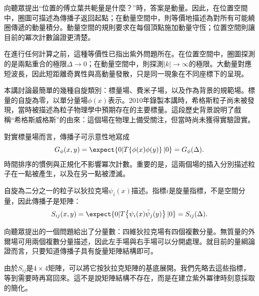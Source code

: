 向聽眾提出``位置的傅立葉共軛量是什麼？''時，答案是動量。因此，在位置空間中，圈圖可描述為傳播子返回起點；在動量空間中，則等價地描述為對所有可能繞圈傳遞的動量積分。動量空間的規則要求在每個頂點施加動量守恆；位置空間則讓目前的冪次計數論證更清楚。

在進行任何計算之前，這種等價性已指出紫外問題所在。在位置空間中，圈圖探測的是兩點重合的極限\(\Delta\to0\)；在動量空間中，則探測\(|k|\to\infty\)的極限。大動量對應短波長，因此短距離奇異性與高動量發散，只是同一現象在不同座標下的呈現。

本講討論最簡單的幾種自旋類別：標量場、費米子場，以及作為背景的規範場。標量的自旋為零，以單分量場\(\phi(x)\)表示。2010年錄製本講時，希格斯粒子尚未被發現，當時被描述為粒子物理學中預期存在的主要標量。這段歷史背景說明了戲稱``希格斯威格斯''的由來：這個場在物理上備受關注，但當時尚未獲得實驗證實。

對實標量場而言，傳播子可示意性地寫成
\begin{equation}
G_\phi(x,y)=\expect{0|T\!\left\{\phi(x)\phi(y)\right\}|0}
=G_\phi(\Delta).
\end{equation}
時間排序的慣例與正規化不影響冪次計數。重要的是，這兩個場的插入分別描述粒子在一點被產生，以及在另一點被湮滅。

\begin{classroomqa}
\end{classroomqa}

自旋為二分之一的粒子以狄拉克場\(\psi_i(x)\)描述。指標\(i\)是旋量指標，不是空間分量，因此傳播子是矩陣：
\begin{equation}
S_{ij}(x,y)=\expect{0|T\!\left\{\psi_i(x)\bar\psi_j(y)\right\}|0}
=S_{ij}(\Delta).
\end{equation}

向聽眾提出的一個問題給出了分量數：四維狄拉克場有四個複數分量。無質量的外爾場可用兩個複數分量描述，因此左手場與右手場可以分開處理。就目前的量綱論證而言，只要知道傳播子具有旋量矩陣結構即可。

由於\(S_{ij}\)是\(4\times4\)矩陣，可以將它按狄拉克矩陣的基底展開。我們先略去這些指標，等到需要時再寫回來。這不是說矩陣結構不存在，而是在建立紫外冪律時刻意採取的簡化。

\begin{classroomqa}
\end{classroomqa}

